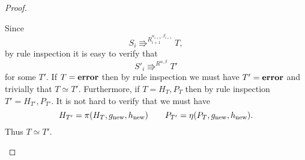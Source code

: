 \begin{proof}
\begin{description}
      Since
      \begin{equation}
        S_i \Rrightarrow^{R_{i+1}^{\alpha_{i+1}, \beta_{i+1}}} T,
      \end{equation}
      by rule inspection it is easy to verify that
      \begin{equation}
        S'_i \Rrightarrow^{R^{\alpha, \beta}} T'
      \end{equation}
      for some $T'$. If $T = \mbox{{\bf error}}$ then by rule inspection we must have $T' =
      \mbox{{\bf error}}$ and trivially that $T \simeq T'$. Furthermore, if $T = H_{T},
      P_{T}$ then by rule inspection $T' = H_{T'}, P_{T'}$. It is not hard to verify that
      we must have
      \begin{equation*}
        H_{T'} = \pi(H_T, g_{\text{new}}, h_{\text{new}}) \quad\quad P_{T'} =
        \eta(P_T, g_{\text{new}}, h_{\text{new}}).
      \end{equation*}
      Thus $T \simeq T'$.
  \end{description}
\end{proof}







